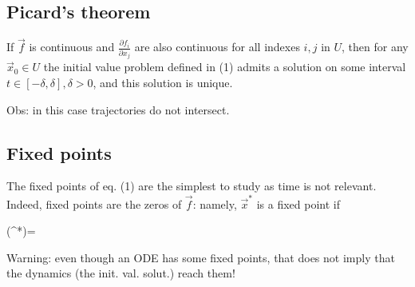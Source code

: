 \subsection*{Picard's theorem}
If $\vec{f}$ is continuous and $\frac{\partial f_{i}}{\partial x_{j}}$ are also continuous for all indexes $i,j$ in $U$, then for any $\vec{x}_{0} \in U$ the initial value problem defined in (1) admits a solution on some interval $t \in[-\delta, \delta], \delta>0$, and this solution is unique.

Obs: in this case trajectories do not intersect.

\subsection*{Fixed points}
The fixed points of eq. (1) are the simplest to study as time is not relevant. Indeed, fixed points are the zeros of $\vec{f}$: namely, $\vec{x}^{*}$ is a fixed point if
\begin{DispWithArrows}[tag=3]
    \left(^{*}\right)=
\end{DispWithArrows}
Warning: even though an ODE has some fixed points, that does not imply that the dynamics (the init. val. solut.) reach them!